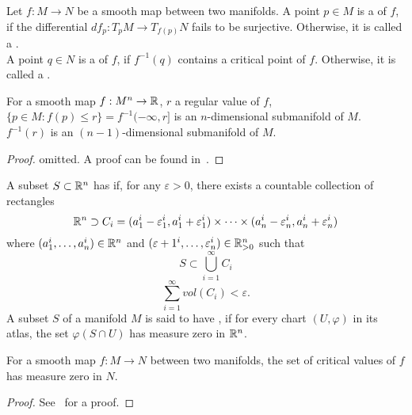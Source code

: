 \documentclass[a4paper,12pt]{article}
\begin{document}
\begin{definition}
    Let \(f:M\to N\) be a smooth map between two manifolds. A point \(p\in M\) is a  of \(f\), if the differential \(df_p:T_p M\to T_{f(p)}N\) fails to be surjective. Otherwise, it is called a .\\
    A point \(q\in N\) is a  of \(f\), if \(f^{-1}(q)\) contains a critical point of \(f\). Otherwise, it is called a .
\end{definition}

\begin{proposition}
    For a smooth map \(f:M^n\to \mathbb{R}\), \(r\) a regular value of \(f\), \(\{p\in M:f(p)\leq r\}=f^{-1}(-\infty,r]\) is an \(n\)-dimensional submanifold of \(M\).\ \(f^{-1}(r)\) is an \((n-1)\)-dimensional submanifold of \(M\).%
\end{proposition}

\begin{proof}
    omitted. A proof can be found in\ \cite{lee}.
\end{proof}


\begin{definition}
    A subset \(S\subset\mathbb{R}^n\) has  if, for any \(\varepsilon>0\), there exists a countable collection of rectangles
    \[\mathbb{R}^n\supset C_i=(a_1^i-\varepsilon_1^i,a_1^i+\varepsilon_1^i)\times\cdots\times(a_n^i-\varepsilon_n^i,a_n^i+\varepsilon_n^i)\]
    where \((a_1^i,\dots,a_n^i)\in\mathbb{R}^n\) and \((\varepsilon+1^i,\dots,\varepsilon_n^i)\in\mathbb{R}^n_{>0}\) such that
    \[S\subset\bigcup_{i=1}^\infty C_i\]
    \[\sum_{i=1}^\infty vol(C_i)<\varepsilon.\]
    A subset \(S\) of a manifold \(M\) is said to have , if for every chart \((U,\varphi)\) in its atlas, the set \(\varphi(S\cap U)\) has measure zero in \(\mathbb{R}^n\).
\end{definition}

\begin{theorem}\label{sard}
    For a smooth map \(f:M\to N\) between two manifolds, the set of critical values of \(f\) has measure zero in \(N\).
\end{theorem}

\begin{proof}
    See\ \cite{lee} for a proof.
\end{proof}
\end{document}
